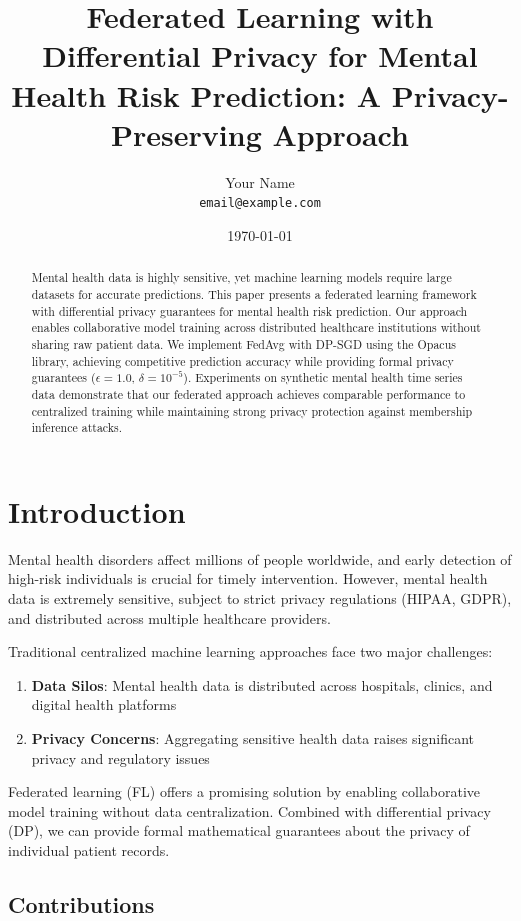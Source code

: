 \documentclass[11pt,a4paper]{article}
\title{Federated Learning with Differential Privacy for Mental Health Risk Prediction: A Privacy-Preserving Approach}
\author{
    Your Name\\
    \texttt{email@example.com}
}
\date{\today}
\begin{document}
\maketitle

\begin{abstract}
Mental health data is highly sensitive, yet machine learning models require large datasets for accurate predictions. This paper presents a federated learning framework with differential privacy guarantees for mental health risk prediction. Our approach enables collaborative model training across distributed healthcare institutions without sharing raw patient data. We implement FedAvg with DP-SGD using the Opacus library, achieving competitive prediction accuracy while providing formal privacy guarantees ($\epsilon = 1.0$, $\delta = 10^{-5}$). Experiments on synthetic mental health time series data demonstrate that our federated approach achieves comparable performance to centralized training while maintaining strong privacy protection against membership inference attacks.
\end{abstract}

\section{Introduction}

Mental health disorders affect millions of people worldwide, and early detection of high-risk individuals is crucial for timely intervention. However, mental health data is extremely sensitive, subject to strict privacy regulations (HIPAA, GDPR), and distributed across multiple healthcare providers.

Traditional centralized machine learning approaches face two major challenges:
\begin{enumerate}
    \item \textbf{Data Silos}: Mental health data is distributed across hospitals, clinics, and digital health platforms
    \item \textbf{Privacy Concerns}: Aggregating sensitive health data raises significant privacy and regulatory issues
\end{enumerate}

Federated learning (FL) offers a promising solution by enabling collaborative model training without data centralization. Combined with differential privacy (DP), we can provide formal mathematical guarantees about the privacy of individual patient records.

\subsection{Contributions}
\end{document}
